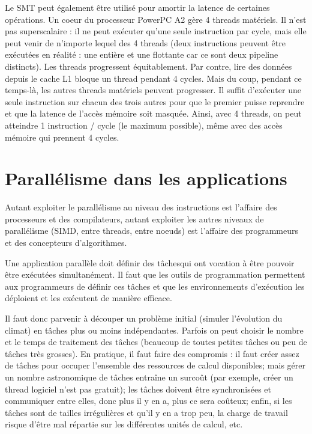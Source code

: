 Le SMT peut également être utilisé pour amortir la latence de certaines
opérations. Un coeur du processeur PowerPC A2 gère 4 threads matériels. Il
n'est pas superscalaire : il ne peut exécuter qu'une seule instruction par
cycle, mais elle peut venir de n'importe lequel des 4 threads (deux instructions
peuvent être exécutées en réalité : une entière et une flottante car ce sont
deux pipeline distincts). Les threads progressent équitablement. Par contre,
lire des données depuis le cache L1 bloque un thread pendant 4 cycles. Mais du
coup, pendant ce temps-là, les autres threads matériels peuvent progresser. Il
suffit d'exécuter une seule instruction sur chacun des trois autres pour que le
premier puisse reprendre et que la latence de l'accès mémoire soit \og
masquée\fg. Ainsi, avec 4 threads, on peut atteindre 1 instruction / cycle (le
maximum possible), même avec des accès mémoire qui prennent 4 cycles.

\section{Parallélisme dans les applications}

Autant exploiter le parallélisme au niveau des instructions est l'affaire des
processeurs et des compilateurs, autant exploiter les autres niveaux de
parallélisme (SIMD, entre threads, entre noeuds) est l'affaire des programmeurs
et des concepteurs d'algorithmes.

Une application parallèle doit définir des \og tâches\fg qui ont vocation à être
pouvoir être exécutées simultanément. Il faut que les outils de programmation
permettent aux programmeurs de définir ces tâches et que les environnements
d'exécution les déploient et les exécutent de manière efficace.

Il faut donc parvenir à découper un problème initial (\og simuler l'évolution du
climat\fg) en tâches plus ou moins indépendantes. Parfois on peut choisir le
nombre et le temps de traitement des tâches (beaucoup de toutes petites tâches
ou peu de tâches très grosses). En pratique, il faut faire des compromis : il
faut créer assez de tâches pour occuper l'ensemble des ressources de calcul
disponibles; mais gérer un nombre astronomique de tâches entraîne un surcoût
(par exemple, créer un thread logiciel n'est pas gratuit); les tâches doivent
être synchronisées et communiquer entre elles, donc plus il y en a, plus ce sera
coûteux; enfin, si les tâches sont de tailles irrégulières et qu'il y en a trop
peu, la charge de travail risque d'être mal répartie sur les différentes unités
de calcul, etc.

